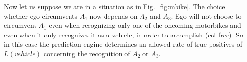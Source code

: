 Now let us suppose we are in a situation as in Fig.~\ref{fig:mbike}. The choice whether ego circumvents $A_1$ now depends on $A_2$ and $A_3$. Ego will not choose to circumvent $A_1$ even when recognizing only one of the oncoming motorbikes and even when it only recognizes it as a vehicle, in order to accomplish (col-free). So in this case the prediction engine determines an allowed rate of true positives of $L(vehicle)$ concerning the recognition of $A_2$ or $A_3$.